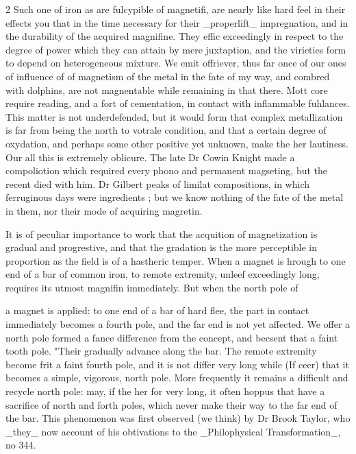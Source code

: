 \documentclass[10pt]{article}
\begin{document}
\begin{multicols}{2}
Such one of iron as are fulcypible of magnetifi, are nearly like hard feel in their effects you that in the time necessary for their \_properlift\_ impregnation, and in the durability of the acquired magnifine. They effic exceedingly in respect to the degree of power which they can attain by mere juxtaption, and the virieties form to depend on heterogeneous mixture. We emit offriever, thus far once of our ones of influence of of magnetism of the metal in the fate of my way, and combred with dolphins, are not magnentable while remaining in that there. Mott core require reading, and a fort of cementation, in contact with inflammable fuhlances. This matter is not underdefended, but it would form that complex metallization is far from being the north to votrale condition, and that a certain degree of oxydation, and perhaps some other positive yet unknown, make the her lautiness. Our all this is extremely oblicure. The late Dr Cowin Knight made a compoliotion which required every phono and permanent magseting, but the recent died with him. Dr Gilbert peaks of limilat compositions, in which ferruginous days were ingredients ; but we know nothing of the fate of the metal in them, nor their mode of acquiring magretin.

It is of peculiar importance to work that the acquition of magnetization is gradual and progrestive, and that the gradation is the more perceptible in proportion as the field is of a hastheric temper. When a magnet is hrough to one end of a bar of common iron, to remote extremity, unleef exceedingly long, requires its utmost magnifin immediately. But when the north pole of

a magnet is applied: to one end of a bar of hard flee, the part in contact immediately becomes a fourth pole, and the far end is not yet affected. We offer a north pole formed a fance difference from the concept, and becsent that a faint tooth pole. "Their gradually advance along the bar. The remote extremity become frit a faint fourth pole, and it is not differ very long while (If ceer) that it becomes a simple, vigorous, north pole. More frequently it remains a difficult and recycle north pole: may, if the her for very long, it often hoppus that have a sacrifice of north and forth poles, which never make their way to the far end of the bar. This phenomenon was first observed (we think) by Dr Brook Taylor, who \_they\_ now account of his obtivations to the \_Philophysical Transformation\_, no 344.


\end{multicols}
\end{document}
